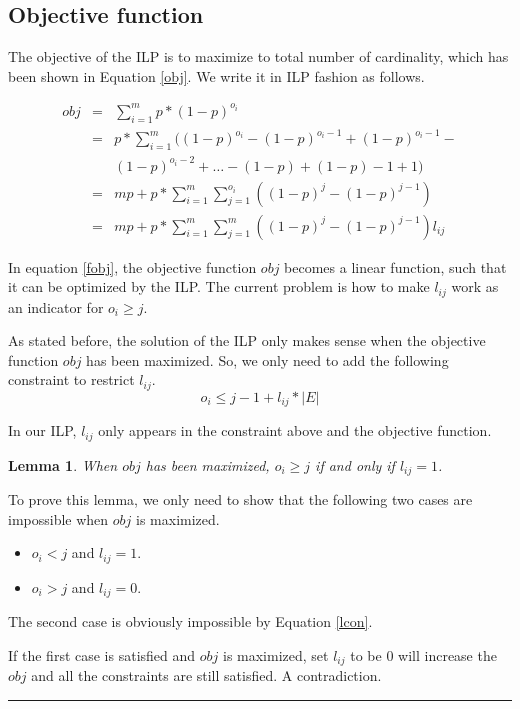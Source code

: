 \documentclass[letterpaper]{article}
\newenvironment{proof}{{Proof:}}{\hfill\rule{2mm}{2mm}}
\newtheorem{lemma}{Lemma}
\begin{document}
\subsection{Objective function}

The objective of the ILP is to maximize to total number of cardinality, which has been shown in Equation \ref{obj}.
We write it in ILP fashion as follows.

\begin{eqnarray}
	obj&=&\sum_{i=1}^{m}p*(1-p)^{o_i}\label{simple}\\
	&= & p*\sum_{i=1}^{m} ((1-p)^{o_i}-(1-p)^{o_{i}-1}+(1-p)^{o_{i}-1}-\nonumber\\
	&&(1-p)^{o_{i}-2}+\ldots-(1-p)+(1-p)-1+1)\\
	&=& mp+p*\sum_{i=1}^{m}\sum_{j=1}^{o_i}((1-p)^j-(1-p)^{j-1})\\
	&=& mp+p*\sum_{i=1}^{m}\sum_{j=1}^{m}((1-p)^j-(1-p)^{j-1})l_{ij}\label{fobj}
\end{eqnarray}

In equation \ref{fobj}, the objective function $obj$ becomes a linear function, such that it can be optimized by the ILP.
The current problem is how to make $l_{ij}$ work as an indicator for $o_i\geq j$.

As stated before, the solution of the ILP only makes sense when the objective function $obj$ has been maximized.
So, we only need to add the following constraint to restrict $l_{ij}$.
\begin{equation}
o_i\leq j-1+l_{ij}*|E|\label{lcon}
\end{equation}

In our ILP, $l_{ij}$ only appears in the constraint above and the objective function.

\begin{lemma}\label{lmm}
	When $obj$ has been maximized, $o_i\geq j$ if and only if $l_{ij}=1$.
\end{lemma}
\begin{proof}
	To prove this lemma, we only need to show that the following two cases are impossible when $obj$ is maximized.
	\begin{itemize}
		\item $o_i<j$ and $l_{ij}=1$.
		\item $o_i>j$ and $l_{ij}=0$.
	\end{itemize}
	The second case is obviously impossible by Equation \ref{lcon}.
	
	If the first case is satisfied and $obj$ is maximized, set $l_{ij}$ to be 0 will increase the $obj$ and all the constraints are still satisfied. A contradiction.
\end{proof}
\end{document}
